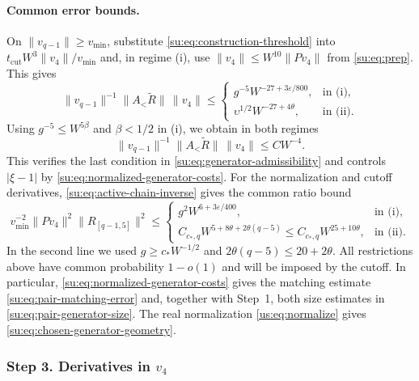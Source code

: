 \documentclass[11pt]{article}
\numberwithin{equation}{section}
\theoremstyle{remark}
\begin{document}
\paragraph{Common error bounds.}
On $\|v_{q-1}\|\ge v_{\min}$, substitute
\eqref{su:eq:construction-threshold} into
$t_{\mathrm{cut}}W^3\|v_4\|/v_{\min}$ and, in regime (i), use
$\|v_4\|\le W^{10}\|Pv_4\|$ from \eqref{su:eq:prep}. This gives
\begin{equation}\label{su:eq:error}
 \|v_{q-1}\|^{-1} \|A_<\widetilde R\|\,\|v_4\|\le
 \begin{cases}
 g^{-5}W^{-27+3\varepsilon/800},&\text{in (i)},\\
 \upsilon^{1/2}W^{-27+4\theta},&\text{in (ii)}.
 \end{cases}
\end{equation}
Using $g^{-5}\le W^{5\beta}$ and $\beta<1/2$ in (i), we obtain in both regimes
\begin{equation}\label{su:eq:construction-error-goal}
 \|v_{q-1}\|^{-1} \|A_<\widetilde R\|\,\|v_4\|\le CW^{-4}.
\end{equation}
This verifies the last condition in \eqref{su:eq:generator-admissibility}
and controls $|\xi-1|$ by \eqref{su:eq:normalized-generator-costs}.
For the normalization and cutoff derivatives, \eqref{su:eq:active-chain-inverse}
gives the common ratio bound
\begin{equation}\label{su:eq:output-derivative-ratio}
 v_{\min}^{-2} \|Pv_4\|^2\|R_{[q-1,5]}\|^2\le
 \begin{cases}
 g^2W^{6+3\varepsilon/400},&\text{in (i)},\\
 C_{c_*,q}W^{5+8\theta+2\theta(q-5)}\le C_{c_*,q}W^{25+10\theta},
       &\text{in (ii)}.
 \end{cases}
\end{equation}
In the second line we used $g\ge c_*W^{-1/2}$ and
$2\theta(q-5)\le20+2\theta$. All restrictions above have common
probability $1-o(1)$ and will be imposed by the cutoff.
In particular, \eqref{su:eq:normalized-generator-costs} gives the matching
estimate \eqref{su:eq:pair-matching-error} and, together with Step~1,
both size estimates in \eqref{su:eq:pair-generator-size}. The real
normalization \eqref{us:eq:normalize} gives \eqref{su:eq:chosen-generator-geometry}.

\subsubsection{Step 3. Derivatives in \texorpdfstring{$v_4$}{v4}}
\label{su:sec:generator-estimates}
\end{document}
